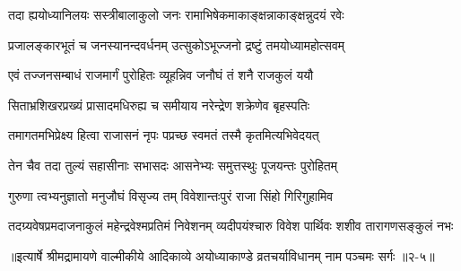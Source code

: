 \twolineshloka
{तदा ह्ययोध्यानिलयः सस्त्रीबालाकुलो जनः}
{रामाभिषेकमाकाङ्क्षन्नाकाङ्क्षन्नुदयं रवेः} %

\twolineshloka
{प्रजालङ्कारभूतं च जनस्यानन्दवर्धनम्}
{उत्सुकोऽभूज्जनो द्रष्टुं तमयोध्यामहोत्सवम्} %

\twolineshloka
{एवं तज्जनसम्बाधं राजमार्गं पुरोहितः}
{व्यूहन्निव जनौघं तं शनै राजकुलं ययौ} %

\twolineshloka
{सिताभ्रशिखरप्रख्यं प्रासादमधिरुह्य च}
{समीयाय नरेन्द्रेण शक्रेणेव बृहस्पतिः} %

\twolineshloka
{तमागतमभिप्रेक्ष्य हित्वा राजासनं नृपः}
{पप्रच्छ स्वमतं तस्मै कृतमित्यभिवेदयत्} %

\twolineshloka
{तेन चैव तदा तुल्यं सहासीनाः सभासदः}
{आसनेभ्यः समुत्तस्थुः पूजयन्तः पुरोहितम्} %

\twolineshloka
{गुरुणा त्वभ्यनुज्ञातो मनुजौघं विसृज्य तम्}
{विवेशान्तःपुरं राजा सिंहो गिरिगुहामिव} %

\twolineshloka
{तदग्र्यवेषप्रमदाजनाकुलं महेन्द्रवेश्मप्रतिमं निवेशनम्}
{व्यदीपयंश्चारु विवेश पार्थिवः शशीव तारागणसङ्कुलं नभः} %


॥इत्यार्षे श्रीमद्रामायणे वाल्मीकीये आदिकाव्ये अयोध्याकाण्डे व्रतचर्याविधानम् नाम पञ्चमः सर्गः ॥२-५॥
